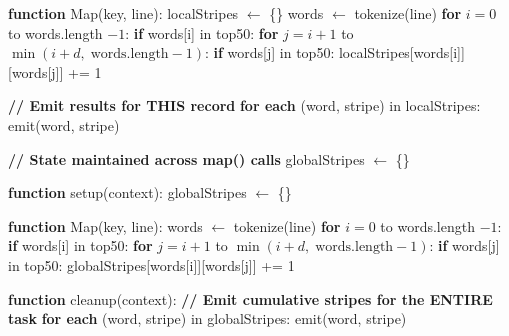 \documentclass[12pt,a4paper]{article}
\begin{document}
\begin{algorithm}
\caption{Map-Function Level Local Aggregation --- Stripes}
\begin{algorithmic}[1]

\State \textbf{function} Map(key, line):
\State \quad localStripes $\gets$ \{\} 
\State \quad words $\gets$ tokenize(line)
\State \quad \textbf{for} $i = 0$ to words.length $- 1$:
\State \qquad \textbf{if} words[i] in top50:
\State \qquad\quad \textbf{for} $j = i + 1$ to $\min(i + d,\; \text{words.length} - 1)$:
\State \qquad\qquad \textbf{if} words[j] in top50:
\State \qquad\qquad\quad localStripes[words[i]][words[j]] += 1

\vspace{0.5em}
\State \quad \textbf{// Emit results for THIS record}
\State \quad \textbf{for each} (word, stripe) in localStripes:
\State \qquad emit(word, stripe)

\end{algorithmic}
\end{algorithm}

\begin{algorithm}
\caption{Map-Class Level Local Aggregation --- Stripes (In-Mapper Combining)}
\begin{algorithmic}[1]

\State \textbf{// State maintained across map() calls}
\State globalStripes $\gets$ \{\} 

\State \textbf{function} setup(context):
\State \quad globalStripes $\gets$ \{\}

\State \textbf{function} Map(key, line):
\State \quad words $\gets$ tokenize(line)
\State \quad \textbf{for} $i = 0$ to words.length $- 1$:
\State \qquad \textbf{if} words[i] in top50:
\State \qquad\quad \textbf{for} $j = i + 1$ to $\min(i + d,\; \text{words.length} - 1)$:
\State \qquad\qquad \textbf{if} words[j] in top50:
\State \qquad\qquad\quad globalStripes[words[i]][words[j]] += 1

\State \textbf{function} cleanup(context):
\State \quad \textbf{// Emit cumulative stripes for the ENTIRE task}
\State \quad \textbf{for each} (word, stripe) in globalStripes:
\State \qquad emit(word, stripe)

\end{algorithmic}
\end{algorithm}
\end{document}

